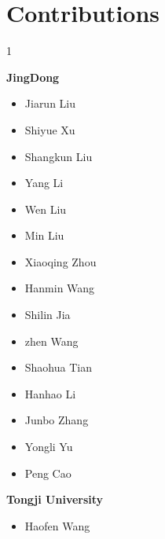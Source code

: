 \section{Contributions}
\begin{multicols}{1}

\textbf{JingDong}
\begin{itemize}
    \item Jiarun Liu
    \item Shiyue Xu
    \item Shangkun Liu
    \item Yang Li
    \item Wen Liu
    \item Min Liu
    \item Xiaoqing Zhou
    \item Hanmin Wang
    \item Shilin Jia
    \item zhen Wang
    \item Shaohua Tian
    \item Hanhao Li
    \item Junbo Zhang    
    \item Yongli Yu
    \item Peng Cao
\end{itemize}

\textbf{Tongji University}
\begin{itemize}
    \item Haofen Wang
\end{itemize}
\end{multicols}